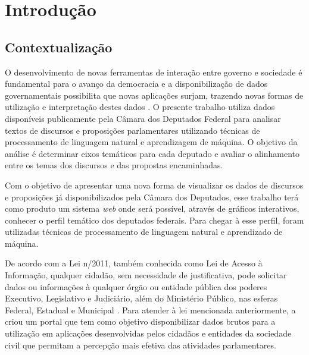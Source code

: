 \chapter{Introdução}

\section{Contextualização}
\label{sec:contextualização}

O desenvolvimento de novas ferramentas de interação entre governo e sociedade é fundamental para o avanço da democracia e a disponibilização de dados governamentais possibilita que novas aplicações surjam, trazendo novas formas de utilização e interpretação destes dados \cite{consegi2011}. O presente trabalho utiliza dados disponíveis publicamente pela Câmara dos Deputados Federal para analisar textos de discursos e proposições parlamentares utilizando técnicas de processamento de linguagem natural e aprendizagem de máquina. O objetivo da análise é determinar eixos temáticos para cada deputado e avaliar o alinhamento entre os temas dos discursos e das propostas encaminhadas.

Com o objetivo de apresentar uma nova forma de visualizar os dados de discursos e proposições já disponibilizados pela Câmara dos Deputados, esse trabalho terá como produto um sistema \textit{web} onde será possível, através de gráficos interativos, conhecer o perfil temático dos deputados federais. Para chegar à esse perfil, foram utilizadas técnicas de processamento de linguagem natural e aprendizado de máquina.

De acordo com a Lei n/2011, também conhecida como Lei de Acesso à Informação, qualquer cidadão, sem necessidade de justificativa, pode solicitar dados ou informações à qualquer órgão ou entidade pública dos poderes Executivo, Legislativo e Judiciário, além do Ministério Público, nas esferas Federal, Estadual e Municipal \cite{lei_acesso_informacao}. Para atender à lei mencionada anteriormente, a  criou um portal que tem como objetivo disponibilizar dados brutos para a utilização em aplicações desenvolvidas pelos cidadãos e entidades da sociedade civil que permitam a percepção mais efetiva das atividades parlamentares.

